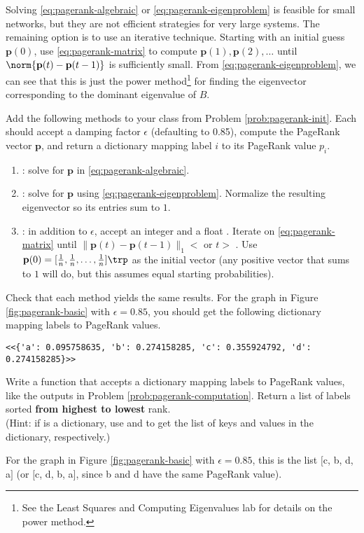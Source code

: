 Solving \eqref{eq:pagerank-algebraic} or \eqref{eq:pagerank-eigenproblem} is feasible for small networks, but they are not efficient strategies for very large systems.
The remaining option is to use an iterative technique.
Starting with an initial guess $\mathbf{p}(0)$, use  \eqref{eq:pagerank-matrix} to compute $\mathbf{p}(1),\mathbf{p}(2),\ldots$ until $\norm{\mathbf{p}(t)-\mathbf{p}(t-1)}$ is sufficiently small.
From \eqref{eq:pagerank-eigenproblem}, we can see that this is just the power method\footnote{See the Least Squares and Computing Eigenvalues lab for details on the power method.} for finding the eigenvector corresponding to the dominant eigenvalue of $B$.

\begin{problem} %
Add the following methods to your class from Problem \ref{prob:pagerank-init}.
Each should accept a damping factor $\epsilon$ (defaulting to 0.85), compute the PageRank vector $\mathbf{p}$, and return a dictionary mapping label $i$ to its PageRank value $p_i$.

\begin{enumerate}
\item {}: solve for $\mathbf{p}$ in \eqref{eq:pagerank-algebraic}.
\item {}: solve for $\mathbf{p}$ using \eqref{eq:pagerank-eigenproblem}.
Normalize the resulting eigenvector so its entries sum to $1$.
\item {}: in addition to $\epsilon$, accept an integer  and a float .
Iterate on \eqref{eq:pagerank-matrix} until $\|\mathbf{p}(t) - \mathbf{p}(t-1)\|_1 < $  or $t > $ .
Use $\mathbf{p}(0)=[\frac{1}{n},\frac{1}{n},\ldots,\frac{1}{n}]\trp$ as the initial vector (any positive vector that sums to $1$ will do, but this assumes equal starting probabilities).
\end{enumerate}
Check that each method yields the same results.
For the graph in Figure \ref{fig:pagerank-basic} with $\epsilon=0.85$, you should get the following dictionary mapping labels to PageRank values.
\begin{lstlisting}
<<{'a': 0.095758635, 'b': 0.274158285, 'c': 0.355924792, 'd': 0.274158285}>>
\end{lstlisting}
\label{prob:pagerank-computation}
\end{problem}

\begin{problem}
Write a function that accepts a dictionary mapping labels to PageRank values, like the outputs in Problem \ref{prob:pagerank-computation}.
Return a list of labels sorted \textbf{from highest to lowest} rank.
\\(Hint: if  is a dictionary, use  and  to get the list of keys and values in the dictionary, respectively.)

For the graph in Figure \ref{fig:pagerank-basic} with $\epsilon=0.85$, this is the list $[$c, b, d, a$]$ (or $[$c, d, b, a$]$, since b and d have the same PageRank value).
\label{prob:pagerank-ranking}
\end{problem}

